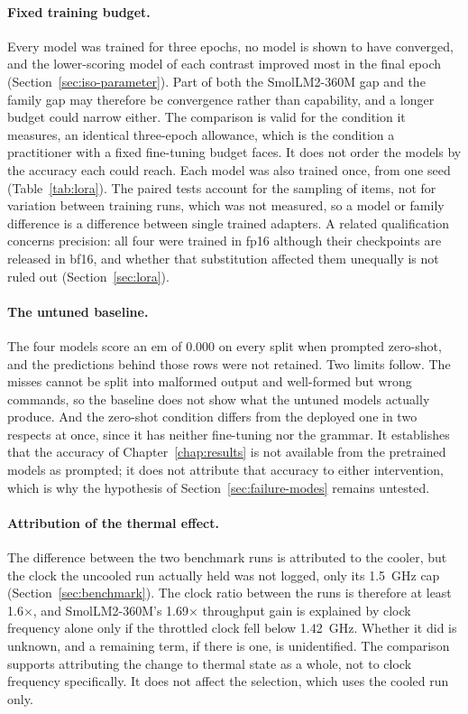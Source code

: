 \paragraph{Fixed training budget.} Every model was trained for three epochs, no model is shown to
have converged, and the lower-scoring model of each contrast improved most in the final epoch
(Section~\ref{sec:iso-parameter}). Part of both the SmolLM2-360M gap and the family gap may
therefore be convergence rather than capability, and a longer budget could narrow either. The
comparison is valid for the condition it measures, an identical three-epoch allowance, which is the
condition a practitioner with a fixed fine-tuning budget faces. It does not order the models by the
accuracy each could reach. Each model was also trained once, from one seed (Table~\ref{tab:lora}).
The paired tests account for the sampling of items, not for variation between training runs, which
was not measured, so a model or family difference is a difference between single trained adapters. A related qualification concerns precision: all four were trained in
fp16 although their checkpoints are released in bf16, and whether that substitution affected them
unequally is not ruled out (Section~\ref{sec:lora}).

\paragraph{The untuned baseline.} The four models score an \gls{em} of 0.000 on every split
when prompted zero-shot, and the predictions behind those rows were not retained. Two limits
follow. The misses cannot be split into malformed output and well-formed but wrong commands, so the
baseline does not show what the untuned models actually produce. And the zero-shot condition
differs from the deployed one in two respects at once, since it has neither fine-tuning nor the
grammar. It establishes that the accuracy of Chapter~\ref{chap:results} is not available from the
pretrained models as prompted; it does not attribute that accuracy to either intervention, which is
why the hypothesis of Section~\ref{sec:failure-modes} remains untested.

\paragraph{Attribution of the thermal effect.} The difference between the two benchmark runs is
attributed to the cooler, but the clock the uncooled run actually held was not logged, only its
1.5~GHz cap (Section~\ref{sec:benchmark}). The clock ratio between the runs is therefore at least
1.6$\times$, and SmolLM2-360M's 1.69$\times$ throughput gain is explained by clock frequency alone
only if the throttled clock fell below 1.42~GHz. Whether it did is unknown, and a remaining term,
if there is one, is unidentified. The comparison supports attributing the change to thermal state
as a whole, not to clock frequency specifically. It does not affect the selection, which uses the
cooled run only.

